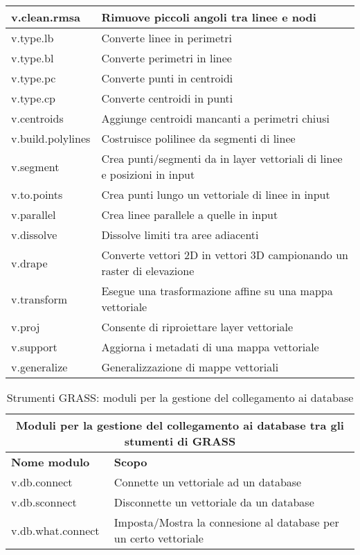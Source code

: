 \begin{table}[ht]
\begin{tabular}{|p{4cm}|p{12cm}|}
  \hline v.clean.rmsa & Rimuove piccoli angoli tra linee e nodi \\
  \hline v.type.lb & Converte linee in perimetri \\
  \hline v.type.bl & Converte perimetri in linee \\
  \hline v.type.pc & Converte punti in centroidi \\
  \hline v.type.cp & Converte centroidi in punti \\
  \hline v.centroids & Aggiunge centroidi mancanti a perimetri chiusi \\
  \hline v.build.polylines & Costruisce polilinee da segmenti di linee \\
  \hline v.segment & Crea punti/segmenti da in layer vettoriali di linee e posizioni in input \\
  \hline v.to.points & Crea punti lungo un vettoriale di linee in input \\
  \hline v.parallel & Crea linee parallele a quelle in input \\
  \hline v.dissolve & Dissolve limiti tra aree adiacenti \\
  \hline v.drape & Converte vettori 2D in vettori 3D campionando un raster di elevazione \\
  \hline v.transform & Esegue una trasformazione affine su una mappa vettoriale \\
  \hline v.proj & Consente di riproiettare layer vettoriale \\
  \hline v.support & Aggiorna i metadati di una mappa vettoriale \\
  \hline v.generalize & Generalizzazione di mappe vettoriali \\
\hline
\end{tabular}
\end{table}

\begin{table}[ht]
\centering
\caption{Strumenti GRASS: moduli per la gestione del collegamento ai database}\medskip
 \begin{tabular}{|p{4cm}|p{12cm}|}
  \hline \multicolumn{2}{|c|}{\textbf{Moduli per la gestione del collegamento ai database tra gli stumenti di GRASS}} \\
  \hline \textbf{Nome modulo} & \textbf{Scopo} \\
  \hline v.db.connect & Connette un vettoriale ad un database \\
  \hline v.db.sconnect & Disconnette un vettoriale da un database \\
  \hline v.db.what.connect & Imposta/Mostra la connesione al database per un certo vettoriale \\
\hline
\end{tabular}
\end{table}

